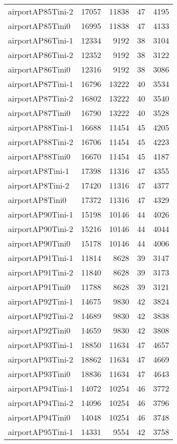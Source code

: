 \begin{longtable}{lrrrr}
airportAP85Tini-2 & 17057 & 11838 & 47 & 4195 \\
airportAP85Tini0 & 16995 & 11838 & 47 & 4133 \\
airportAP86Tini-1 & 12334 & 9192 & 38 & 3104 \\
airportAP86Tini-2 & 12352 & 9192 & 38 & 3122 \\
airportAP86Tini0 & 12316 & 9192 & 38 & 3086 \\
airportAP87Tini-1 & 16796 & 13222 & 40 & 3534 \\
airportAP87Tini-2 & 16802 & 13222 & 40 & 3540 \\
airportAP87Tini0 & 16790 & 13222 & 40 & 3528 \\
airportAP88Tini-1 & 16688 & 11454 & 45 & 4205 \\
airportAP88Tini-2 & 16706 & 11454 & 45 & 4223 \\
airportAP88Tini0 & 16670 & 11454 & 45 & 4187 \\
airportAP8Tini-1 & 17398 & 11316 & 47 & 4355 \\
airportAP8Tini-2 & 17420 & 11316 & 47 & 4377 \\
airportAP8Tini0 & 17372 & 11316 & 47 & 4329 \\
airportAP90Tini-1 & 15198 & 10146 & 44 & 4026 \\
airportAP90Tini-2 & 15216 & 10146 & 44 & 4044 \\
airportAP90Tini0 & 15178 & 10146 & 44 & 4006 \\
airportAP91Tini-1 & 11814 & 8628 & 39 & 3147 \\
airportAP91Tini-2 & 11840 & 8628 & 39 & 3173 \\
airportAP91Tini0 & 11788 & 8628 & 39 & 3121 \\
airportAP92Tini-1 & 14675 & 9830 & 42 & 3824 \\
airportAP92Tini-2 & 14689 & 9830 & 42 & 3838 \\
airportAP92Tini0 & 14659 & 9830 & 42 & 3808 \\
airportAP93Tini-1 & 18850 & 11634 & 47 & 4657 \\
airportAP93Tini-2 & 18862 & 11634 & 47 & 4669 \\
airportAP93Tini0 & 18836 & 11634 & 47 & 4643 \\
airportAP94Tini-1 & 14072 & 10254 & 46 & 3772 \\
airportAP94Tini-2 & 14096 & 10254 & 46 & 3796 \\
airportAP94Tini0 & 14048 & 10254 & 46 & 3748 \\
airportAP95Tini-1 & 14331 & 9554 & 42 & 3758 \\

\end{longtable}
